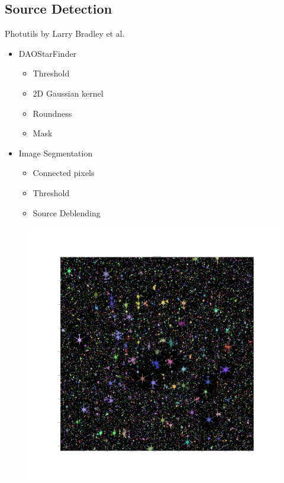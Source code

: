 \documentclass{beamer}
\begin{document}
\subsection{Source Detection}

\begin{frame}
Photutils by Larry Bradley et al.
\\[2ex]
\begin{itemize}
\item DAOStarFinder
	\begin{itemize}
	\item Threshold
	\item 2D Gaussian kernel
	\item Roundness
	\item Mask
	\end{itemize}

\item Image Segmentation
	\begin{itemize}
	\item Connected pixels 
	\item Threshold
	\item Source Deblending
	\end{itemize}
\end{itemize}

\end{frame}


\begin{frame}
\begin{figure}
\centering
\includegraphics[width=\textwidth,height=\textheight,keepaspectratio]{Images/ISPhotutils_32BK_4THRE_3Kernel.png}
\end{figure}
\end{frame}
\end{document}
